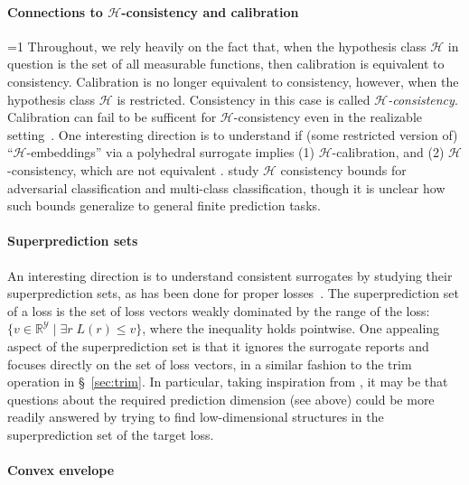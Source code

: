 \documentclass[twoside,11pt]{article}
\newcommand{\CommentsR}{1}
\newcommand{\reviewerresponse}[2]{\ifnum\CommentsR=1%
  \todo[linecolor=#1!80!black,backgroundcolor=#1,bordercolor=#1!80!black]{#2}\fi}
\newcommand{\reviewertwo}[1]{\reviewerresponse{blue!20!white}{R2: #1}}
\newcommand{\reals}{\mathbb{R}}
\renewcommand{\H}{\mathcal{H}}
\newcommand{\Y}{\mathcal{Y}}
\begin{document}
\paragraph{Connections to $\H$-consistency and calibration}
\reviewertwo{A}
Throughout, we rely heavily on the fact that, when the hypothesis class $\H$ in question is the set of all measurable functions, then calibration is equivalent to consistency.
Calibration is no longer equivalent to consistency, however, when the hypothesis class $\H$ is restricted.
Consistency in this case is called \emph{$\H$-consistency}.
Calibration can fail to be sufficent for $\H$-consistency even in the realizable setting~\citep{long2013consistency,kuznetov2014multiclass,zhang2020bayes}.
One interesting direction is to understand if (some restricted version of) ``$\H$-embeddings'' via a polyhedral surrogate implies (1) $\H$-calibration, and (2) $\H$-consistency, which are not equivalent \citep{awasthi2021calibration,awasthi2021finer}.
\citet{awasthi2022hconsistency,awasthi2022multi} study $\H$ consistency bounds for adversarial classification and multi-class classification, though it is unclear how such bounds generalize to general finite prediction tasks.


\paragraph{Superprediction sets}

An interesting direction is to understand consistent surrogates by studying their superprediction sets, as has been done for proper losses~\citep{williamson2014geometry}.
The superprediction set of a loss is the set of loss vectors weakly dominated by the range of the loss: $\{v \in \reals^\Y \mid \exists r\; L(r) \leq v\}$, where the inequality holds pointwise.
One appealing aspect of the superprediction set is that it ignores the surrogate reports and focuses directly on the set of loss vectors, in a similar fashion to the trim operation in \S~\ref{sec:trim}.
In particular, taking inspiration from \citet{ramaswamy2016convex}, it may be that questions about the required prediction dimension (see above) could be more readily answered by trying to find low-dimensional structures in the superprediction set of the target loss.


\paragraph{Convex envelope}
\end{document}

